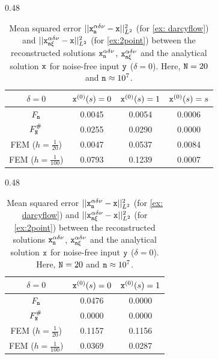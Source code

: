 \documentclass[10pt]{article}
\numberwithin{equation}{section}
\theoremstyle{nonumberplain}
\newcommand{\y}{{\tt y}}
\newcommand{\n}{{\tt n}}
\newcommand{\x}{{\tt x}}
\newcommand{\no}{{\tt N}}
\begin{document}
\begin{table}[H]
    \hspace{0.55cm}\centering \footnotesize
    \begin{subtable}{0.48\textwidth}
        \centering
        \begin{tabular}{c|c|c|c}
            $\delta = 0$ & $\x^{(0)}(s) = 0$ & $\x^{(0)}(s) = 1$ & $\x^{(0)}(s) = s$\\ \hline
            $F_\n$ & 0.0045 & 0.0054 & 0.0006\\ \hline
            $F_\no^\#$ & 0.0255 & 0.0290 & 0.0000 \\ \hline
            FEM ($h = \frac{1}{20}$) & 0.0047 & 0.0537 & 0.0084 \\ \hline
            FEM ($h = \frac{1}{100}$) & 0.0793 & 0.1239  & 0.0007\\
        \end{tabular}
        \caption{\autoref{ex: darcyflow}, $\delta = 0$}
    \end{subtable}
    \hfill
    \begin{subtable}{0.48\textwidth}
        \centering
        \begin{tabular}{c|c|c}
            $\delta = 0$ & $\x^{(0)}(s) = 0$ & $\x^{(0)}(s) = 1$ \\ \hline
            $F_\n$  & 0.0476 & 0.0000\\ \hline
            $F_\no^\#$ & 0.0000 & 0.0000 \\ \hline
            FEM ($h = \frac{1}{20}$) & 0.1157 & 0.1156 \\ \hline
            FEM ($h = \frac{1}{100}$) & 0.0369 & 0.0287 \\
        \end{tabular}
        \caption{\autoref{ex:2point}, $\delta = 0$}
    \end{subtable}
    \caption{Mean squared error $||\x_\n^{\alpha\delta\nu} - \x||_{L^2}^2$ (for \autoref{ex: darcyflow}) and $||\x_{\n\xi}^{\alpha\delta\nu} - \x||_{L^2}^2$  (for \autoref{ex:2point}) between the reconstructed solutions $\x_\n^{\alpha\delta\nu}$, $\x_{\n\xi}^{\alpha\delta\nu}$ and the analytical solution $\x$ for noise-free input $\y$ ($\delta = 0$). Here, $\no = 20$ and $\n \approx 10^7$.}
    \label{tab:mse}
\end{table}
\end{document}
